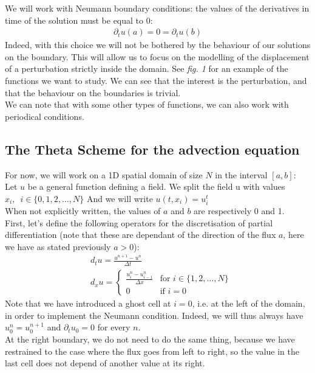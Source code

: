 \documentclass[12pt]{article}
\begin{document}
We will work with Neumann boundary conditions: the values of the derivatives in time of the solution must be equal to 0:
\begin{align*}
    \partial_t u (a) = 0 = \partial_t u (b)
\end{align*}
Indeed, with this choice we will not be bothered by the behaviour of our solutions on the boundary.
This will allow us to focus on the modelling of the displacement of a perturbation strictly inside the domain. See \textit{fig. 1} for an example of the functions we want to study.
We can see that the interest is the perturbation, and that the behaviour on the boundaries is trivial.\\
We can note that with some other types of functions, we can also work with periodical conditions.

\vspace{10pt}

\subsection{The Theta Scheme for the advection equation}

For now, we will work on a 1D spatial domain of size $N$ in the interval $[a,b]$:\\
Let $u$ be a general function defining a field. We split the field u with values $ x_i \text{,} \hspace{8pt} i \in \{0, 1, 2, \ldots, N\}$
And we will write $u(t,x_i) = u_i^t$ \\
When not explicitly written, the values of $a$ and $b$ are respectively 0 and 1.\\

First, let's define the following operators for the discretisation of partial differentiation 
(note that these are dependant of the direction of the flux $a$, here we have as stated previously $a > 0$):
\begin{align*}
    & d_t u = \frac{u^{n+1} - u^n}{\Delta t} \\
    & d_x u = 
    \begin{cases} 
        \frac{u_{i}^n - u_{i-1}^n}{\Delta x} & \text{for } i \in \{1, 2, \ldots, N\} \\
        0 & \text{if } i = 0 
    \end{cases}
\end{align*}
Note that we have introduced a ghost cell at $i=0$, i.e. at the left of the domain, in order to implement the Neumann condition.
Indeed, we will thus always have $u_0^n = u_0^{n+1}$ and $\partial_t u_0 = 0$ for every $n$.\\
At the right boundary, we do not need to do the same thing, because we have restrained to the case where the flux goes from left to right, so the value in the last cell does not depend of another value at its right.
\end{document}

